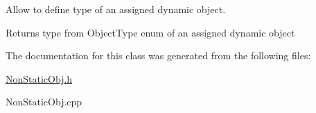 Allow to define type of an assigned dynamic object. 

\begin{DoxyReturn}{Returns}
type from Object\+Type enum of an assigned dynamic object 
\end{DoxyReturn}


The documentation for this class was generated from the following files\+:\begin{DoxyCompactItemize}
\item 
\hyperlink{_non_static_obj_8h}{Non\+Static\+Obj.\+h}\item 
Non\+Static\+Obj.\+cpp\end{DoxyCompactItemize}
